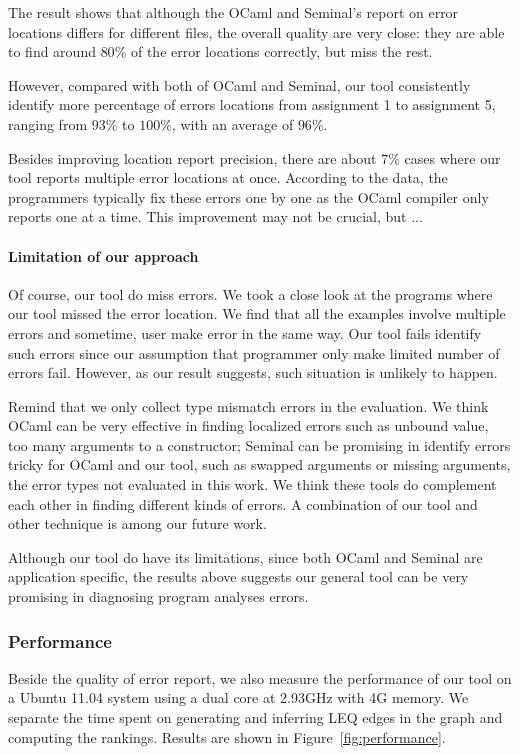 The result shows that although the OCaml and Seminal's report on error
locations differs for different files, the overall quality are very
close: they are able to find around $80\%$ of the error locations
correctly, but miss the rest. 

However, compared with both of OCaml and Seminal, our tool
consistently identify more percentage of errors locations from
assignment 1 to assignment 5, ranging from $93\%$ to $100\%$, with an
average of $96\%$.

Besides improving location report precision, there are about $7\%$
cases where our tool reports multiple error locations at once.
According to the data, the programmers typically fix these errors one
by one as the OCaml compiler only reports one at a time. This
improvement may not be crucial, but ...

\paragraph{Limitation of our approach}
Of course, our tool do miss errors. We took a close look at the
programs where our tool missed the error location. We find that all
the examples involve multiple errors and sometime, user make error in
the same way. Our tool fails identify such errors since our assumption
that programmer only make limited number of errors fail. However, as
our result suggests, such situation is unlikely to happen.

Remind that we only collect type mismatch errors in the evaluation. We
think OCaml can be very effective in finding localized errors such as
unbound value, too many arguments to a constructor; Seminal can be
promising in identify errors tricky for OCaml and our tool, such as
swapped arguments or missing arguments, the error types not evaluated
in this work. We think these tools do complement each other in finding
different kinds of errors. A combination of our tool and other
technique is among our future work.

Although our tool do have its limitations, since both OCaml and
Seminal are application specific, the results above suggests our
general tool can be very promising in diagnosing program analyses
errors.

\subsubsection{Performance}

Beside the quality of error report, we also measure the performance of
our tool on a Ubuntu 11.04 system using a dual core at 2.93GHz with 4G
memory. We separate the time spent on generating and inferring LEQ
edges in the graph and computing the rankings. Results are shown in
Figure~\ref{fig:performance}.

